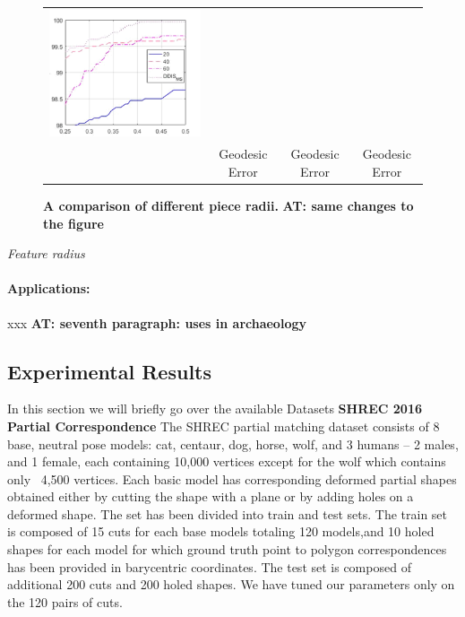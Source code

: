 \documentclass[10pt,twocolumn,letterpaper]{article}
\newcommand{\colornote}[3]{{\color{#1}\bf{#2: #3}\normalfont}}
\newcommand{\colornote}[3]{}
\newcommand {\ayellet}[1]{\colornote{blue}{AT}{#1}}
\begin{document}
{\begin{figure}[htb]
\begin{tabular}{cccc}
		\includegraphics[scale=0.5]{figures/PieceSizeHigh.png}
		\\
		& Geodesic Error &  Geodesic Error &  Geodesic Error\\
	\end{tabular}
	\caption{{\bf A comparison of different piece radii.} \ayellet{same changes to the figure}}
		\label{fig:DifferentRadii}
\end{figure}
}

\textit{Feature radius} 

\paragraph{Applications:} xxx
\ayellet{seventh paragraph: uses in archaeology}

\subsection{Experimental Results}
In this section we will briefly go over the available Datasets
\textbf{SHREC 2016 Partial Correspondence}  
The SHREC partial matching dataset\cite{cosmo2016shrec} consists of 8 base, neutral pose models: cat, centaur, dog, horse, wolf, and 3 humans – 2 males, and 1 female, each containing 10,000 vertices except for the wolf which contains only ~4,500 vertices. Each basic model has corresponding deformed partial shapes obtained either by cutting the shape with a plane or by adding holes on a deformed shape. The set has been divided into train and test sets. The train set is composed of 15 cuts for each base models totaling 120 models,and 10 holed shapes for each model for which ground truth point to polygon correspondences has been provided in barycentric coordinates. The test set is composed of additional 200 cuts and 200 holed shapes. We have tuned our parameters only on the 120 pairs of cuts.
\end{document}
